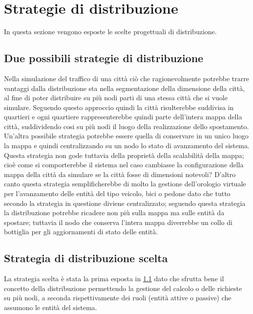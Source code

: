 \section{Strategie di distribuzione}
In questa sezione vengono esposte le scelte progettuali di distribuzione.\\
\subsection{Due possibili strategie di distribuzione}
\label{scelted}
Nella simulazione del traffico di una città ciò che ragionevolmente potrebbe trarre vantaggi dalla distribuzione sta nella segmentazione della dimensione della città, al fine di poter distribuire su più nodi parti di una stessa città che si vuole simulare. Seguendo questo approccio quindi la città risulterebbe suddivisa in quartieri e ogni quartiere rappresenterebbe quindi parte dell'intera mappa della città, suddividendo cosi su più nodi il luogo della realizzazione dello spostamento. \\
Un'altra possibile strategia potrebbe essere quella di conservare in un unico luogo la mappa e quindi centralizzando su un nodo lo stato di avanzamento del sistema. Questa strategia non gode tuttavia della proprietà della scalabilità della mappa; cioè come si comporterebbe il sistema nel caso cambiasse la configurazione della mappa della città da simulare se la città fosse di dimensioni notevoli? D'altro canto questa strategia semplificherebbe di molto la gestione dell'orologio virtuale per l'avanzamento delle entità del tipo veicolo, bici o pedone dato che tutto secondo la strategia in questione diviene centralizzato; seguendo questa strategia la distribuzione potrebbe ricadere non più sulla mappa ma sulle entità da spostare; tuttavia il nodo che conserva l'intera mappa diverrebbe un collo di bottiglia per gli aggiornamenti di stato delle entità. \\
\subsection{Strategia di distribuzione scelta}
La strategia scelta è stata la prima esposta in \ref{scelted} dato che sfrutta bene il concetto della distribuzione permettendo la gestione del calcolo o delle richieste su più nodi, a seconda rispettivamente dei ruoli (entità attive o passive) che assumono le entità del sistema.

